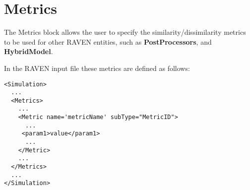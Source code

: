 
\section{Metrics}
\label{sec:Metrics}

\newcommand{\metrictypeI}[3]
{
  This metric interface directly with the metric available within \textit{#1}.
  The specifications of this metric must be defined within the XML block \xmlNode{#2}.
  This XML node needs to contain the following subnode:

  \begin{itemize}
    \item \xmlNode{metricType}\texttt{#3}\xmlNode{/metricType}, \xmlDesc{vertical bar (\texttt{|}) separated
      string, required field}.
  \end{itemize}

}
\newcommand{\metrictypeII}[3]
{
  \metrictypeI{#1}{#2}{#3}

  In addition to this XML subnode, the users can also specify the weights for given metric:
  \begin{itemize}
    \item \xmlNode{w}, \xmlDesc{comma separated floats, optional parameter}, the weights for each value in \textit{u}
      and \textit{v}. Default is None, which gives each value a weight of 1.0.
  \end{itemize}
}

\newcommand{\metrictypeIII}[3]
{
  \metrictypeI{#1}{#2}{#3}

  In addition to this XML subnode, the users can also specify the weights for given metric:
  \begin{itemize}
    \item \xmlNode{sample\_weight}, \xmlDesc{comma separated floats, optional parameter}, the weights for each value in \textit{u}
      and \textit{v}. Default is None, which gives each value a weight of 1.0.
  \end{itemize}
}

The Metrics block allows the user to specify the similarity/dissimilarity metrics to be used for other
RAVEN entities, such as \textbf{PostProcessors}, and \textbf{HybridModel}.

In the RAVEN input file these metrics are defined as follows:
\begin{lstlisting}[style=XML]
<Simulation>
  ...
  <Metrics>
    ...
    <Metric name='metricName' subType="MetricID">
      ...
     <param1>value</param1>
      ...
    </Metric>
    ...
  </Metrics>
  ...
</Simulation>
\end{lstlisting}

